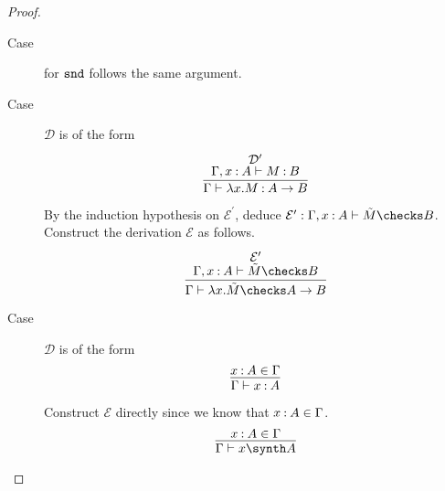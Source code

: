 \documentclass[11pt,letterpaper]{article}
\begin{document}
\begin{proof}
\begin{description}
    \item[Case]
      for $\operatorname{\mathtt{snd}}$ follows the same argument.

    \item[Case]
      $\mathcal{D}$ is of the form
      \begin{equation*}
        \infer{
          \Gamma \proves \lambda x. M \hastype A \to B
        }{
          \deduce[\mathcal{D}^\prime]{
            \Gamma, x \hastype A \proves M \hastype B
          }{}
        }
      \end{equation*}

      By the induction hypothesis on $\mathcal{E}^\prime$,
      deduce
      $\mathcal{E}^\prime : \Gamma, x \hastype A \proves \tilde M \checks B$.
      Construct the derivation $\mathcal{E}$ as follows.
      \begin{equation*}
        \infer{
          \Gamma \proves \lambda x. \tilde M \checks A \to B
        }{
          \deduce[\mathcal{E}^\prime]{
            \Gamma, x \hastype A \proves \tilde M \checks B
          }{}
        }
      \end{equation*}

    \item[Case]
      $\mathcal{D}$ is of the form
      \begin{equation*}
        \infer{
          \Gamma \proves x \hastype A
        }{
          x \hastype A \in \Gamma
        }
      \end{equation*}

      Construct $\mathcal{E}$ directly since we know that
      $x \mathbin{:} A \in \Gamma$.
      \begin{equation*}
        \infer{
          \Gamma \proves x \synth A
        }{
          x \hastype A \in \Gamma
        }
      \end{equation*}
  \end{description}
\end{proof}
\end{document}
